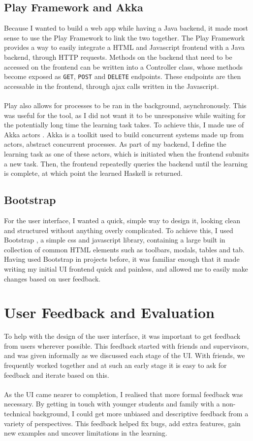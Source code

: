 \subsection{Play Framework and Akka}
Because I wanted to build a web app while having a Java backend, it made most sense to use the Play Framework \cite{Play} to link the two together. The Play Framework provides a way to easily integrate a HTML and Javascript frontend with a Java backend, through HTTP requests. Methods on the backend that need to be accessed on the frontend can be written into a Controller class, whose methods become exposed as \lstinline{GET}, \lstinline{POST} and \lstinline{DELETE} endpoints. These endpoints are then accessable in the frontend, through ajax calls written in the Javascript. \\ \\%
Play also allows for processes to be ran in the background, asynchronously. This was useful for the tool, as I did not want it to be unresponsive while waiting for the potentially long time the learning task takes. To achieve this, I made use of Akka actors \cite{Akka}. Akka is a toolkit used to build concurrent systems made up from actors, abstract concurrent processes. As part of my backend, I define the learning task as one of these actors, which is initiated when the frontend submits a new task. Then, the frontend repeatedly queries the backend until the learning is complete, at which point the learned Haskell is returned.

\subsection{Bootstrap}
For the user interface, I wanted a quick, simple way to design it, looking clean and structured without anything overly complicated. To achieve this, I used Bootstrap \cite{Bootstrap}, a simple css and javascript library, containing a large built in collection of common HTML elements such as toolbars, modals, tables and tab. Having used Bootstrap in projects before, it was familiar enough that it made writing my initial UI frontend quick and painless, and allowed me to easily make changes based on user feedback.

\section{User Feedback and Evaluation}
To help with the design of the user interface, it was important to get feedback from users wherever possible. This feedback started with friends and supervisors, and was given informally as we discussed each stage of the UI. With friends, we frequently worked together and at such an early stage it is easy to ask for feedback and iterate based on this. \\ \\
As the UI came nearer to completion, I realised that more formal feedback was necessary. By getting in touch with younger students and family with a non-technical background, I could get more unbiased and descriptive feedback from a variety of perspectives. This feedback helped fix bugs, add extra features, gain new examples and uncover limitations in the learning.


\pagebreak
%
%